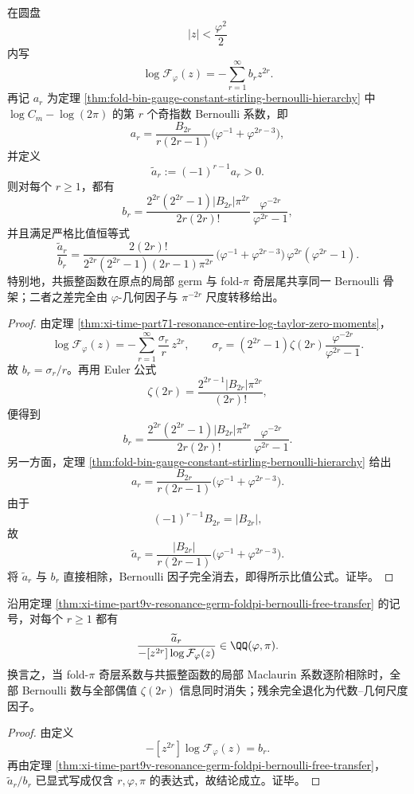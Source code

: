 \begin{theorem}\label{thm:xi-time-part9v-resonance-germ-foldpi-bernoulli-free-transfer}
在圆盘
\[
|z|<\frac{\varphi^2}{2}
\]
内写
\[
\log \mathcal F_\varphi(z)=-\sum_{r=1}^{\infty}b_r z^{2r}.
\]
再记 \(a_r\) 为定理 \ref{thm:fold-bin-gauge-constant-stirling-bernoulli-hierarchy} 中
\(
\log C_m-\log(2\pi)
\)
的第 \(r\) 个奇指数 Bernoulli 系数，即
\[
a_r=\frac{B_{2r}}{r(2r-1)}
\bigl(\varphi^{-1}+\varphi^{2r-3}\bigr),
\]
并定义
\[
\widetilde a_r:=(-1)^{r-1}a_r>0.
\]
则对每个 \(r\ge 1\)，都有
\[
b_r=
\frac{2^{2r}(2^{2r}-1)|B_{2r}|\pi^{2r}}{2r(2r)!}\,
\frac{\varphi^{-2r}}{\varphi^{2r}-1},
\]
并且满足严格比值恒等式
\[
\frac{\widetilde a_r}{b_r}
=
\frac{2(2r)!}{2^{2r}(2^{2r}-1)(2r-1)\pi^{2r}}\,
\bigl(\varphi^{-1}+\varphi^{2r-3}\bigr)\,
\varphi^{2r}(\varphi^{2r}-1).
\]
特别地，共振整函数在原点的局部 germ 与 fold-\(\pi\) 奇层尾共享同一 Bernoulli 骨架；二者之差完全由 \(\varphi\)-几何因子与 \(\pi^{-2r}\) 尺度转移给出。
\end{theorem}
\begin{proof}
由定理 \ref{thm:xi-time-part71-resonance-entire-log-taylor-zero-moments}，
\[
\log \mathcal F_\varphi(z)
=
-\sum_{r=1}^{\infty}\frac{\sigma_r}{r}\,z^{2r},
\qquad
\sigma_r=
(2^{2r}-1)\zeta(2r)\frac{\varphi^{-2r}}{\varphi^{2r}-1}.
\]
故 \(b_r=\sigma_r/r\)。再用 Euler 公式
\[
\zeta(2r)=\frac{2^{2r-1}|B_{2r}|\pi^{2r}}{(2r)!},
\]
便得到
\[
b_r=
\frac{2^{2r}(2^{2r}-1)|B_{2r}|\pi^{2r}}{2r(2r)!}\,
\frac{\varphi^{-2r}}{\varphi^{2r}-1}.
\]
另一方面，定理 \ref{thm:fold-bin-gauge-constant-stirling-bernoulli-hierarchy} 给出
\[
a_r=\frac{B_{2r}}{r(2r-1)}
\bigl(\varphi^{-1}+\varphi^{2r-3}\bigr).
\]
由于
\[
(-1)^{r-1}B_{2r}=|B_{2r}|,
\]
故
\[
\widetilde a_r=
\frac{|B_{2r}|}{r(2r-1)}
\bigl(\varphi^{-1}+\varphi^{2r-3}\bigr).
\]
将 \(\widetilde a_r\) 与 \(b_r\) 直接相除，Bernoulli 因子完全消去，即得所示比值公式。证毕。
\end{proof}

\begin{corollary}\label{cor:xi-time-part9v-bernoulli-elimination-principle}
沿用定理 \ref{thm:xi-time-part9v-resonance-germ-foldpi-bernoulli-free-transfer} 的记号，对每个 \(r\ge 1\) 都有
\[
\frac{\widetilde a_r}{-[z^{2r}]\log \mathcal F_\varphi(z)}
\in
\QQ(\varphi,\pi).
\]
换言之，当 fold-\(\pi\) 奇层系数与共振整函数的局部 Maclaurin 系数逐阶相除时，全部 Bernoulli 数与全部偶值 \(\zeta(2r)\) 信息同时消失；残余完全退化为代数--几何尺度因子。
\end{corollary}
\begin{proof}
由定义
\[
-[z^{2r}]\log \mathcal F_\varphi(z)=b_r.
\]
再由定理 \ref{thm:xi-time-part9v-resonance-germ-foldpi-bernoulli-free-transfer}，
\(
\widetilde a_r/b_r
\)
已显式写成仅含 \(r,\varphi,\pi\) 的表达式，故结论成立。证毕。
\end{proof}

